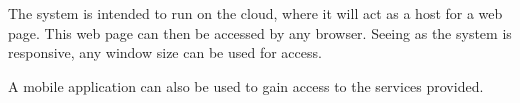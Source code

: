 The system is intended to run on the cloud, where it will act as a host for a web page. This web page can then be accessed by any browser. Seeing as the system is responsive, any window size can be used for access.

A mobile application can also be used to gain access to the services provided.
